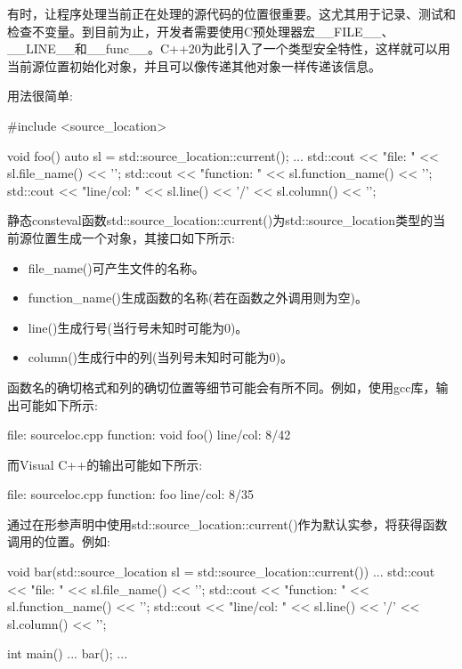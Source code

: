 有时，让程序处理当前正在处理的源代码的位置很重要。这尤其用于记录、测试和检查不变量。到目前为止，开发者需要使用C预处理器宏\_\_FILE\_\_、\_\_LINE\_\_和\_\_func\_\_。C++20为此引入了一个类型安全特性，这样就可以用当前源位置初始化对象，并且可以像传递其他对象一样传递该信息。

用法很简单:

\begin{cpp}
#include <source_location>

void foo()
{
	auto sl = std::source_location::current();
	...
	std::cout << "file: " << sl.file_name() << '\n';
	std::cout << "function: " << sl.function_name() << '\n';
	std::cout << "line/col: " << sl.line() << '/' << sl.column() << '\n';
}
\end{cpp}

静态consteval函数std::source\_location::current()为std::source\_location类型的当前源位置生成一个对象，其接口如下所示:

\begin{itemize}
\item
file\_name()可产生文件的名称。

\item
function\_name()生成函数的名称(若在函数之外调用则为空)。

\item
line()生成行号(当行号未知时可能为0)。

\item
column()生成行中的列(当列号未知时可能为0)。
\end{itemize}

函数名的确切格式和列的确切位置等细节可能会有所不同。例如，使用gcc库，输出可能如下所示:

\begin{shell}
file:     sourceloc.cpp
function: void foo()
line/col: 8/42
\end{shell}

而Visual C++的输出可能如下所示:

\begin{shell}
file:     sourceloc.cpp
function: foo
line/col: 8/35
\end{shell}

通过在形参声明中使用std::source\_location::current()作为默认实参，将获得函数调用的位置。例如:

\begin{cpp}
void bar(std::source_location sl = std::source_location::current())
{
	...
	std::cout << "file: " << sl.file_name() << '\n';
	std::cout << "function: " << sl.function_name() << '\n';
	std::cout << "line/col: " << sl.line() << '/' << sl.column() << '\n';
}

int main()
{
	...
	bar();
	...
}
\end{cpp}

